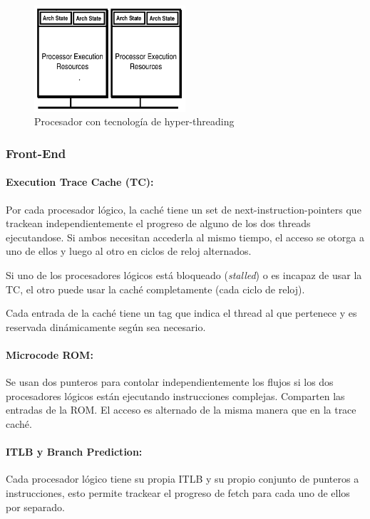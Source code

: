 \begin{figure}[ht]
	\centering
	\includegraphics[width=0.5\textwidth]{imagenes/multithreading-procesor}
	\caption{Procesador con tecnología de hyper-threading}
	\label{fig:xenonHyperThreadingTechnology}
\end{figure}

\subsubsection{Front-End}
\paragraph{Execution Trace Cache (TC):}
Por cada procesador lógico, la caché tiene un set de next-instruction-pointers que trackean independientemente el progreso de alguno de los dos threads ejecutandose. Si ambos necesitan accederla al mismo tiempo, el acceso se otorga a uno de ellos y luego al otro en ciclos de reloj alternados.
	
Si uno de los procesadores lógicos está bloqueado (\textit{stalled}) o es incapaz de usar la TC, el otro puede usar la caché completamente (cada ciclo de reloj).

Cada entrada de la caché tiene un tag que indica el thread al que pertenece y es reservada dinámicamente según sea necesario.

\paragraph{Microcode ROM:} Se usan dos punteros para contolar independientemente los flujos si los dos procesadores lógicos están ejecutando instrucciones complejas. Comparten las entradas de la ROM. El acceso es alternado de la misma manera que en la trace caché.

\paragraph{ITLB y Branch Prediction:} Cada procesador lógico tiene su propia ITLB y su propio conjunto de punteros a instrucciones, esto permite trackear el progreso de fetch para cada uno de ellos por separado.

